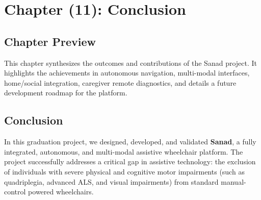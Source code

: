 \setcounter{chapter}{11} 
\chapter*{Chapter (11): Conclusion}
\setcounter{section}{0}

\section{Chapter Preview}
This chapter synthesizes the outcomes and contributions of the Sanad project. It highlights the achievements in autonomous navigation, multi-modal interfaces, home/social integration, caregiver remote diagnostics, and details a future development roadmap for the platform.

\section{Conclusion}

In this graduation project, we designed, developed, and validated \textbf{Sanad}, a fully integrated, autonomous, and multi-modal assistive wheelchair platform. The project successfully addresses a critical gap in assistive technology: the exclusion of individuals with severe physical and cognitive motor impairments (such as quadriplegia, advanced ALS, and visual impairments) from standard manual-control powered wheelchairs.

